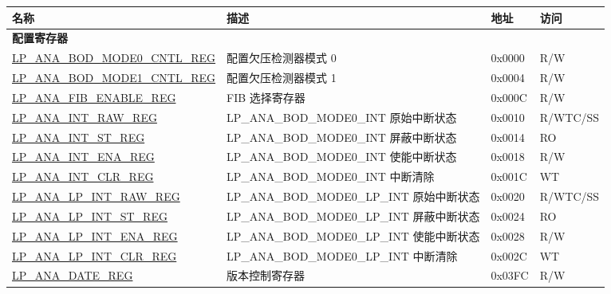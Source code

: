 \begin{longtable}{ | l | l | l | l | }
\hline\rowcolor{lightgray}
\textbf{名称} & \textbf{描述} &  \textbf{地址} & \textbf{访问} \\ \hline
\endhead
\multicolumn{4}{|l|}{\textbf{配置寄存器}} \\ \hline
\hyperref[regdesc:LPANABODMODE0CNTLREG]{LP\_ANA\_BOD\_MODE0\_CNTL\_REG} & 配置欠压检测器模式 0 & 0x0000 & R/W \\ \hline\hyperref[regdesc:LPANABODMODE1CNTLREG]{LP\_ANA\_BOD\_MODE1\_CNTL\_REG} &  配置欠压检测器模式 1 & 0x0004 & R/W \\  \hline\hyperref[regdesc:LPANAFIBENABLEREG]{LP\_ANA\_FIB\_ENABLE\_REG} & FIB 选择寄存器 & 0x000C & R/W \\ \hline\hyperref[regdesc:LPANAINTRAWREG]{LP\_ANA\_INT\_RAW\_REG} &  LP\_ANA\_BOD\_MODE0\_INT 原始中断状态 & 0x0010 & R/WTC/SS \\ \hline\hyperref[regdesc:LPANAINTSTREG]{LP\_ANA\_INT\_ST\_REG} & LP\_ANA\_BOD\_MODE0\_INT 屏蔽中断状态 & 0x0014 & RO \\ \hline\hyperref[regdesc:LPANAINTENAREG]{LP\_ANA\_INT\_ENA\_REG} & LP\_ANA\_BOD\_MODE0\_INT 使能中断状态 & 0x0018 & R/W \\ \hline\hyperref[regdesc:LPANAINTCLRREG]{LP\_ANA\_INT\_CLR\_REG} & LP\_ANA\_BOD\_MODE0\_INT 中断清除 & 0x001C & WT \\ \hline\hyperref[regdesc:LPANALPINTRAWREG]{LP\_ANA\_LP\_INT\_RAW\_REG} & LP\_ANA\_BOD\_MODE0\_LP\_INT 原始中断状态 & 0x0020 & R/WTC/SS \\ \hline\hyperref[regdesc:LPANALPINTSTREG]{LP\_ANA\_LP\_INT\_ST\_REG} & LP\_ANA\_BOD\_MODE0\_LP\_INT 屏蔽中断状态 & 0x0024 & RO \\ \hline\hyperref[regdesc:LPANALPINTENAREG]{LP\_ANA\_LP\_INT\_ENA\_REG} & LP\_ANA\_BOD\_MODE0\_LP\_INT 使能中断状态 & 0x0028 & R/W \\ \hline\hyperref[regdesc:LPANALPINTCLRREG]{LP\_ANA\_LP\_INT\_CLR\_REG} & LP\_ANA\_BOD\_MODE0\_LP\_INT  中断清除 & 0x002C & WT \\ \hline\hyperref[regdesc:LPANADATEREG]{LP\_ANA\_DATE\_REG} & 版本控制寄存器 & 0x03FC & R/W \\ \hline\end{longtable}
